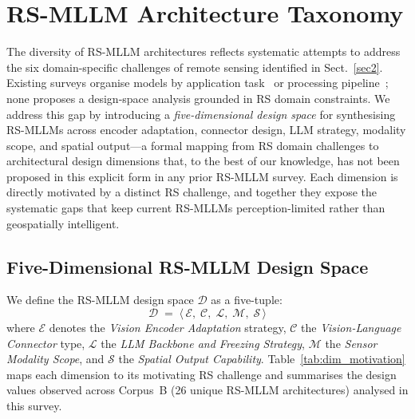
\section{RS-MLLM Architecture Taxonomy}\label{sec3}

The diversity of RS-MLLM architectures reflects systematic attempts to address the six
domain-specific challenges of remote sensing identified in Sect.~\ref{sec2}. Existing
surveys organise models by application task~\cite{li2024survey} or processing
pipeline~\cite{weng2025isprs}; none proposes a design-space analysis grounded in RS
domain constraints. We address this gap by introducing a \emph{five-dimensional design
space} for synthesising RS-MLLMs across encoder adaptation, connector design, LLM
strategy, modality scope, and spatial output---a formal mapping from RS domain challenges
to architectural design dimensions that, to the best of our knowledge, has not been
proposed in this explicit form in any prior RS-MLLM survey. Each dimension
is directly motivated by a distinct RS challenge, and together they expose the systematic
gaps that keep current RS-MLLMs perception-limited rather than geospatially intelligent.

\subsection{Five-Dimensional RS-MLLM Design Space}\label{sec3:5d}

We define the RS-MLLM design space $\mathcal{D}$ as a five-tuple:
\begin{equation}
  \mathcal{D} \;=\; \bigl\langle\,
    \mathcal{E},\;\mathcal{C},\;\mathcal{L},\;\mathcal{M},\;\mathcal{S}
  \,\bigr\rangle
  \label{eq:design_space}
\end{equation}
where $\mathcal{E}$ denotes the \emph{Vision Encoder Adaptation} strategy,
$\mathcal{C}$ the \emph{Vision-Language Connector} type,
$\mathcal{L}$ the \emph{LLM Backbone and Freezing Strategy},
$\mathcal{M}$ the \emph{Sensor Modality Scope}, and
$\mathcal{S}$ the \emph{Spatial Output Capability}.
Table~\ref{tab:dim_motivation} maps each dimension to its motivating RS challenge and
summarises the design values observed across Corpus~B (26 unique RS-MLLM architectures) analysed in this survey.

